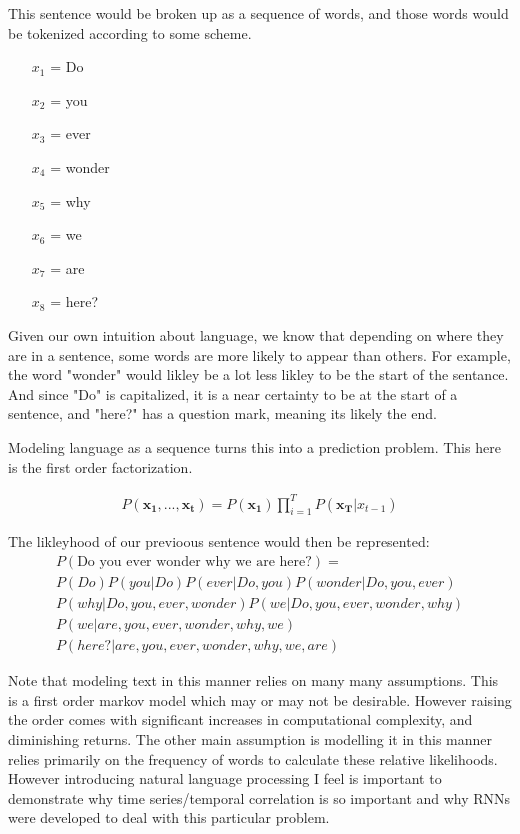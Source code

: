 \documentclass{article}
\begin{document}
This sentence would be broken up as a sequence of words, and those words would be tokenized according to some scheme.

\begin{enumerate}
\item[$x_1$] = Do
\item[$x_2$] = you
\item[$x_3$] = ever
\item[$x_4$] = wonder
\item[$x_5$] = why
\item[$x_6$] = we
\item[$x_7$] = are
\item[$x_8$] = here?
\end{enumerate}

Given our own intuition about language, we know that depending on where they are in a sentence, some words are more likely to appear than others. For example, the word "wonder" would likley be a lot less likley to be the start of the sentance. And since "Do" is capitalized, it is a near certainty to be at the start of a sentence, and "here?" has a question mark, meaning its likely the end.

Modeling language as a sequence turns this into a prediction problem. This here is the first order factorization.

\begin{align*}
P(\mathbf{x_1},...,\mathbf{x_t}) = P(\mathbf{x_1}) \prod_{i=1}^{T} P(\mathbf{x_T}|x_{t-1})
\end{align*}

The likleyhood of our previoous sentence would then be represented:
\begin{align*}
P(\text{Do you ever wonder why we are here?}) = \\ P(Do) P(you|Do) P(ever|Do,you) P(wonder|Do,you,ever) \\ P(why|Do,you,ever,wonder) P(we|Do,you,ever,wonder,why) \\ P(we|are,you,ever,wonder,why,we) \\ P(here?|are,you,ever,wonder,why,we,are)
\end{align*}

Note that modeling text in this manner relies on many many assumptions. This is a first order markov model which may or may not be desirable. However raising the order comes with significant increases in computational complexity, and diminishing returns. The other main assumption is modelling it in this manner relies primarily on the frequency of words to calculate these relative likelihoods. However introducing natural language processing I feel is important to demonstrate why time series/temporal correlation is so important and why RNNs were developed to deal with this particular problem.
\end{document}
